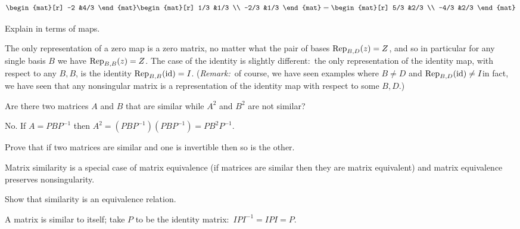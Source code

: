 \begin{exercises}
\begin{answer}
\begin{equation*}
\begin{mat}[r]
           -2  &4/3
         \end{mat}
         \begin{mat}[r]
           1/3 &1/3 \\
          -2/3 &1/3
         \end{mat}
         =
         \begin{mat}[r]
           5/3 &2/3 \\
          -4/3 &2/3
         \end{mat}
      \end{equation*}  
    \end{answer}
  \item 
    Explain  in terms of maps.
    \begin{answer}
      The only representation of a zero map is a zero matrix,
      no matter what the pair of bases $\rep{z}{B,D}=Z$,
      and so in particular for any single basis $B$ we have $\rep{z}{B,B}=Z$.  
      The case of the identity is slightly different:~the 
      only representation of the identity map, with respect to any $B,B$, 
      is the identity $\rep{\identity}{B,B}=I$.
      (\textit{Remark:}~of course, we have seen examples where $B\neq D$ and 
      $\rep{\identity}{B,D}\neq I$\Dash in fact, we have seen that any 
      nonsingular matrix is a representation of the identity map with
      respect to some $B,D$.)
    \end{answer}
  \recommended \item 
    \cite{Halmos}
    Are there two matrices \( A \) and \( B \) that are
    similar while \( A^2 \) and \( B^2 \) are not similar?
    \begin{answer}
      No.
      If \( A=PBP^{-1} \) then \( A^2=(PBP^{-1})(PBP^{-1})=PB^2P^{-1} \).
    \end{answer}
  \recommended \item
    Prove that if two matrices are similar and one is invertible then
    so is the other.
    \begin{answer}
       Matrix similarity is a special case of matrix equivalence 
       (if matrices are similar then they are matrix equivalent)
       and matrix equivalence preserves nonsingularity.
    \end{answer}
  \recommended \item \label{exer:SimIsEquivRel}
    Show that similarity is an equivalence relation.
    \begin{answer}
       A matrix is similar to itself; take \( P \) to be the identity
       matrix:~$IPI^{-1}=IPI=P$.


\end{answer}
\end{exercises}

